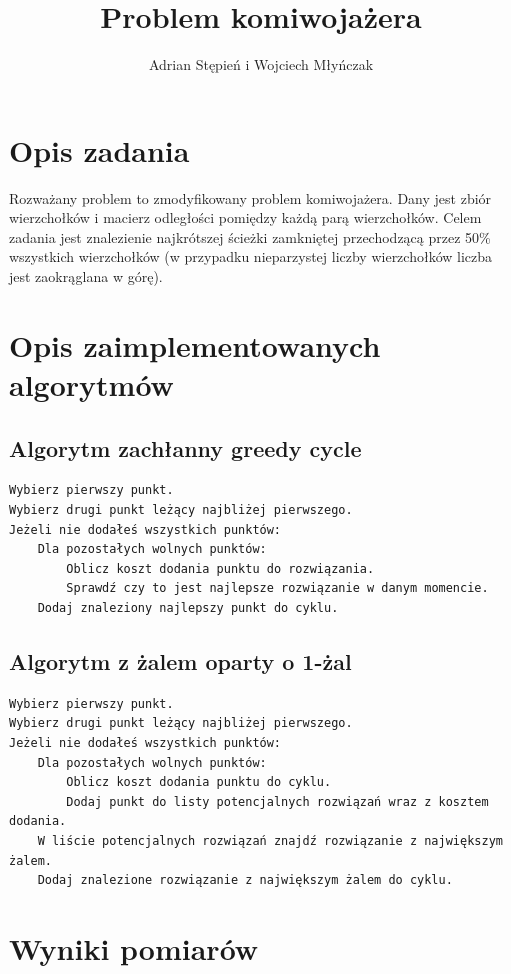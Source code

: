 \documentclass[a4paper]{article}
\title{Problem komiwojażera}
\author{Adrian Stępień i Wojciech Młyńczak}
\begin{document}
\maketitle

\section{Opis zadania}

Rozważany problem to zmodyfikowany problem komiwojażera. Dany jest zbiór wierzchołków i macierz odległości pomiędzy każdą parą wierzchołków. Celem zadania jest znalezienie najkrótszej ścieżki zamkniętej przechodzącą przez 50\% wszystkich wierzchołków (w przypadku nieparzystej liczby wierzchołków liczba jest zaokrąglana w górę).

\section{Opis zaimplementowanych algorytmów}

\subsection{Algorytm zachłanny greedy cycle}

\begin{lstlisting}
Wybierz pierwszy punkt.
Wybierz drugi punkt leżący najbliżej pierwszego.
Jeżeli nie dodałeś wszystkich punktów:
	Dla pozostałych wolnych punktów:
		Oblicz koszt dodania punktu do rozwiązania.
		Sprawdź czy to jest najlepsze rozwiązanie w danym momencie.
	Dodaj znaleziony najlepszy punkt do cyklu.
\end{lstlisting}

\subsection{Algorytm z żalem oparty o 1-żal}

\begin{lstlisting}
Wybierz pierwszy punkt.
Wybierz drugi punkt leżący najbliżej pierwszego.
Jeżeli nie dodałeś wszystkich punktów:
	Dla pozostałych wolnych punktów:
		Oblicz koszt dodania punktu do cyklu.
		Dodaj punkt do listy potencjalnych rozwiązań wraz z kosztem dodania.
	W liście potencjalnych rozwiązań znajdź rozwiązanie z największym żalem.
	Dodaj znalezione rozwiązanie z największym żalem do cyklu.
\end{lstlisting}

\section{Wyniki pomiarów}
\end{document}
